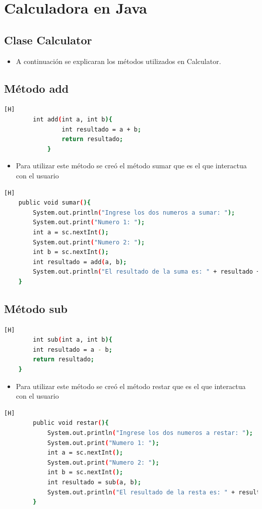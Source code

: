 \documentclass{article}
\begin{document}
\section{Calculadora en Java}
	\subsection{Clase Calculator}
	
	\begin{itemize}
		\item  A continuación se explicaran los métodos utilizados en Calculator.
	\end{itemize}
	\subsection{Método add}
	\begin{lstlisting}[language=bash,caption={Código del método add}][H]
		int add(int a, int b){
        		int resultado = a + b;
        		return resultado;
    		}	
	\end{lstlisting}
	\begin{itemize}
		\item  Para utilizar este método se creó el método sumar que es el que interactua con el usuario
	\end{itemize}
	\begin{lstlisting}[language=bash,caption={Código del método sumar}][H]
	public void sumar(){
        System.out.println("Ingrese los dos numeros a sumar: ");
        System.out.print("Numero 1: ");
        int a = sc.nextInt();
        System.out.print("Numero 2: ");
        int b = sc.nextInt();
        int resultado = add(a, b);
        System.out.println("El resultado de la suma es: " + resultado + "\n");
    }	
	\end{lstlisting}
	\subsection{Método sub}
	\begin{lstlisting}[language=bash,caption={Código del método sub}][H]
		int sub(int a, int b){
        int resultado = a - b;
        return resultado; 
    }	
	\end{lstlisting}
	\begin{itemize}
		\item  Para utilizar este método se creó el método restar que es el que interactua con el usuario
	\end{itemize}
	\begin{lstlisting}[language=bash,caption={Código del método restar}][H]
		public void restar(){
			System.out.println("Ingrese los dos numeros a restar: ");
			System.out.print("Numero 1: ");
			int a = sc.nextInt();
			System.out.print("Numero 2: ");
			int b = sc.nextInt();
			int resultado = sub(a, b);
			System.out.println("El resultado de la resta es: " + resultado + "\n");
		}	
	\end{lstlisting}
\end{document}
